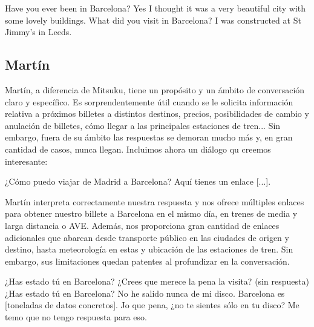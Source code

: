 \documentclass[final]{CSP}
\begin{document}
\begin{drama}

    \hspeaks Have you ever been in Barcelona?
    \mspeaks Yes I thought it was a very beautiful city with some lovely buildings.
    \hspeaks What did you visit in Barcelona?
    \mspeaks I was constructed at St Jimmy's in Leeds.
\end{drama}

\subsection{Martín}

Martín, a diferencia de Mitsuku, tiene un propósito y un ámbito de conversación claro y específico.
Es sorprendentemente útil cuando se le solicita información relativa a próximos billetes a 
distintos destinos, precios, posibilidades de cambio y anulación de billetes, cómo llegar a
las principales estaciones de tren... Sin embargo, fuera de su ámbito las respuestas se demoran
mucho más y, en gran cantidad de casos, nunca llegan. Incluimos ahora un diálogo qu creemos 
interesante:

\begin{drama}

    \hspeaks ¿Cómo puedo viajar de Madrid a Barcelona?
    \mspeaks Aquí tienes un enlace [...]. 
\end{drama}

Martín interpreta correctamente nuestra respuesta y nos ofrece múltiples enlaces para obtener
nuestro billete a Barcelona en el mismo día, en trenes de media y larga distancia o AVE. Además,
nos proporciona gran cantidad de enlaces adicionales que abarcan desde transporte público en
las ciudades de origen y destino, hasta meteorología en estas y ubicación de las estaciones de
tren. Sin embargo, sus limitaciones quedan patentes al profundizar en la conversación.

\begin{drama}

    \hspeaks ¿Has estado tú en Barcelona? ¿Crees que merece la pena la visita?
    \mspeaks (sin respuesta)
    \hspeaks ¿Has estado tú en Barcelona?
    \mspeaks No he salido nunca de mi disco. Barcelona es [toneladas de datos concretos].
    \hspeaks Jo que pena, ¿no te sientes sólo en tu disco?
    \mspeaks Me temo que no tengo respuesta para eso.
\end{drama}
\end{document}
